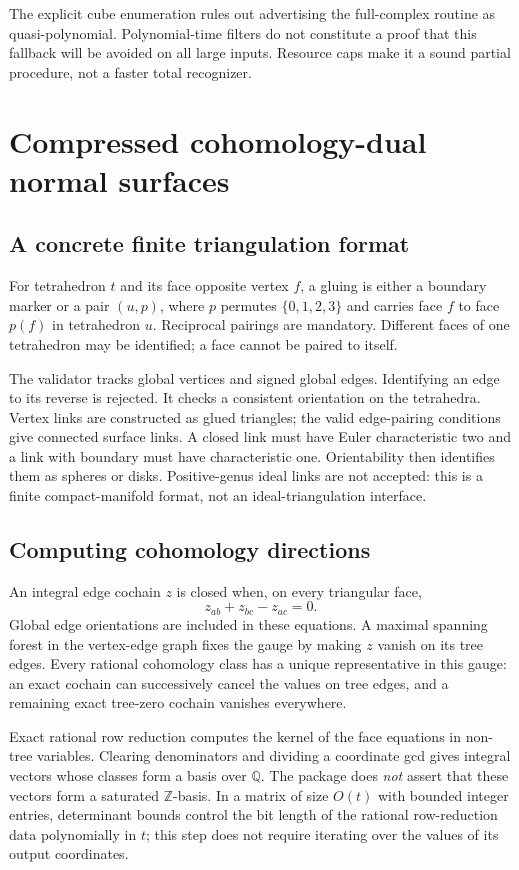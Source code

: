 \documentclass[11pt]{article}
\theoremstyle{remark}\newtheorem{remark}[theorem]{Remark}
\newcommand{\Q}{\mathbb Q}
\newcommand{\Z}{\mathbb Z}
\begin{document}
The explicit cube enumeration rules out advertising the full-complex routine
as quasi-polynomial. Polynomial-time filters do not constitute a proof that
this fallback will be avoided on all large inputs. Resource caps make it a
sound partial procedure, not a faster total recognizer.

\section{Compressed cohomology-dual normal surfaces}
\subsection{A concrete finite triangulation format}
For tetrahedron $t$ and its face opposite vertex $f$, a gluing is either a
boundary marker or a pair $(u,p)$, where $p$ permutes $\{0,1,2,3\}$ and carries
face $f$ to face $p(f)$ in tetrahedron $u$. Reciprocal pairings are mandatory.
Different faces of one tetrahedron may be identified; a face cannot be paired
to itself.

The validator tracks global vertices and signed global edges. Identifying an
edge to its reverse is rejected. It checks a consistent orientation on the
tetrahedra. Vertex links are constructed as glued triangles; the valid
edge-pairing conditions give connected surface links. A closed link must have
Euler characteristic two and a link with boundary must have characteristic
one. Orientability then identifies them as spheres or disks. Positive-genus
ideal links are not accepted: this is a finite compact-manifold format, not an
ideal-triangulation interface.

\subsection{Computing cohomology directions}
An integral edge cochain $z$ is closed when, on every triangular face,
\[
 z_{ab}+z_{bc}-z_{ac}=0.
\]
Global edge orientations are included in these equations. A maximal spanning
forest in the vertex-edge graph fixes the gauge by making $z$ vanish on its
tree edges. Every rational cohomology class has a unique representative in
this gauge: an exact cochain can successively cancel the values on tree edges,
and a remaining exact tree-zero cochain vanishes everywhere.

Exact rational row reduction computes the kernel of the face equations in
non-tree variables. Clearing denominators and dividing a coordinate gcd gives
integral vectors whose classes form a basis over $\Q$. The package does
\emph{not} assert that these vectors form a saturated $\Z$-basis. In a matrix
of size $O(t)$ with bounded integer entries, determinant bounds control the
bit length of the rational row-reduction data polynomially in $t$; this step
does not require iterating over the values of its output coordinates.
\end{document}
